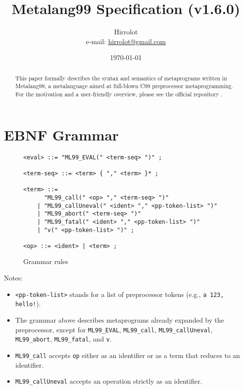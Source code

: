 \documentclass[12pt]{article}
\theoremstyle{break}
\begin{document}
\title{Metalang99 Specification (v1.6.0)}
\date{\today}
\author{Hirrolot \\ e-mail: \href{mailto:hirrolot@gmail.com}{hirrolot@gmail.com}}
\maketitle

\begin{abstract}
This paper formally describes the syntax and semantics of metaprograms written in Metalang99,
a metalanguage aimed at full-blown C99 preprocessor metaprogramming. For the motivation and
a user-friendly overview, please see the official repository \cite{Metalang99}.
\end{abstract}

\tableofcontents

\newpage

\section{EBNF Grammar}

\begin{figure}[H]
    \caption{Grammar rules}

\begin{verbatim}
<eval> ::= "ML99_EVAL(" <term-seq> ")" ;

<term-seq> ::= <term> { "," <term> }* ;

<term> ::=
      "ML99_call(" <op> "," <term-seq> ")"
    | "ML99_callUneval(" <ident> "," <pp-token-list> ")"
    | "ML99_abort(" <term-seq> ")"
    | "ML99_fatal(" <ident> "," <pp-token-list> ")"
    | "v(" <pp-token-list> ")" ;

<op> ::= <ident> | <term> ;
\end{verbatim}

\end{figure}

Notes:

\begin{itemize}
    \item \texttt{<pp-token-list>} stands for a list of preprocessor tokens (e.g., \texttt{a 123, hello!}).
    \item The grammar above describes metaprograms already expanded by the preprocessor,
    except for \texttt{ML99\_EVAL}, \texttt{ML99\_call}, \texttt{ML99\_callUneval}, \\
    \texttt{ML99\_abort}, \texttt{ML99\_fatal}, and \texttt{v}.
    \item \texttt{ML99\_call} accepts \texttt{op} either as an identifier or as a term that
    reduces to an identifier.
    \item \texttt{ML99\_callUneval} accepts an operation strictly as an identifier.
\end{itemize}
\end{document}
